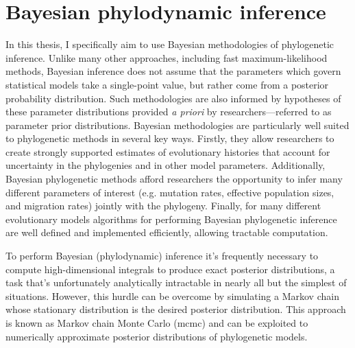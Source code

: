 \section{Bayesian phylodynamic inference}

In this thesis, I specifically aim to use Bayesian methodologies of phylogenetic inference.
Unlike many other approaches, including fast maximum-likelihood methods, Bayesian inference does not assume that the parameters which govern statistical models take a single-point value, but rather come from a posterior probability distribution.
Such methodologies are also informed by hypotheses of these parameter distributions provided \textit{a priori} by researchers---referred to as parameter prior distributions.
Bayesian methodologies are particularly well suited to phylogenetic methods in several key ways.
Firstly, they allow researchers to create strongly supported estimates of evolutionary histories that account for uncertainty in the phylogenies and in other model parameters. %
Additionally, Bayesian phylogenetic methods afford researchers the opportunity to infer many different parameters of interest (e.g. mutation rates, effective population sizes, and migration rates) jointly with the phylogeny.
Finally, for many different evolutionary models algorithms for performing Bayesian phylogenetic inference are well defined and implemented efficiently, allowing tractable computation. %

To perform Bayesian (phylodynamic) inference it's frequently necessary to compute high-dimensional integrals to produce exact posterior distributions, a task that's unfortunately analytically intractable in nearly all but the simplest of situations.
However, this hurdle can be overcome by simulating a Markov chain whose stationary distribution is the desired posterior distribution.
This approach is known as Markov chain Monte Carlo (\gls{mcmc}) and can be exploited to numerically approximate posterior distributions of phylogenetic models.

